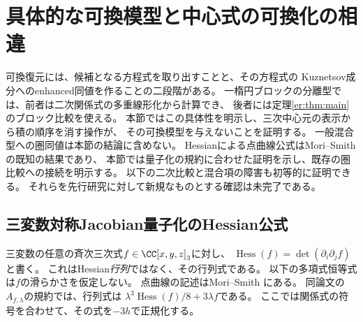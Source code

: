 \section{具体的な可換模型と中心式の可換化の相違}
\label{em:sec:comparison}

可換復元には、候補となる方程式を取り出すことと、その方程式の
Kuznetsov成分へのenhanced同値を作ることの二段階がある。
一楕円ブロックの分離型では、前者は二次関係式の多重線形化から計算でき、
後者には定理\ref{er:thm:main}のブロック比較を使える。
本節ではこの具体性を明示し、三次中心元の表示から積の順序を消す操作が、
その可換模型を与えないことを証明する。
一般混合型への圏同値は本節の結論に含めない。
Hessianによる点曲線公式はMori--Smithの既知の結果であり、
本節では量子化の規約に合わせた証明を示し、既存の圏比較への接続を明示する。
以下の二次比較と混合項の障害も初等的に証明できる。
それらを先行研究に対して新規なものとする確認は未完了である。

\subsection{三変数対称Jacobian量子化のHessian公式}

三変数の任意の斉次三次式$f\in\CC[x,y,z]_3$に対し、
$\operatorname{Hess}(f)=\det(\partial_i\partial_j f)$と書く。
これはHessian\emph{行列}ではなく、その行列式である。
以下の多項式恒等式は$f$の滑らかさを仮定しない。
点曲線の記述はMori--Smith
\cite[Lemma 7.1, Theorem 7.2, pp.~23--25]{PMoriSmith}にある。
同論文の$A_{f,\lambda}$の規約では、行列式は
$\lambda^3\operatorname{Hess}(f)/8+3\lambda f$である。
ここでは関係式の符号を合わせて、その式を$-3h$で正規化する。

